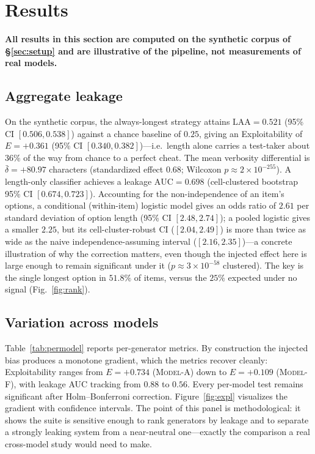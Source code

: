 \documentclass[10pt,twocolumn]{article}
\begin{document}
\section{Results}
\label{sec:results}

\noindent\textbf{All results in this section are computed on the synthetic
corpus of \S\ref{sec:setup} and are illustrative of the pipeline, not
measurements of real models.}

\subsection{Aggregate leakage}
On the synthetic corpus, the always-longest strategy attains
$\mathrm{LAA}=0.521$ (95\% CI $[0.506,0.538]$) against a chance baseline of
$0.25$, giving an Exploitability of $E={+}0.361$ (95\% CI
$[0.340,0.382]$)---i.e.\ length alone carries a test-taker about $36\%$ of the
way from chance to a perfect cheat. The mean verbosity differential is
$\bar\delta={+}80.97$ characters (standardized effect $0.68$; Wilcoxon
$p\approx2\times10^{-255}$). A length-only classifier achieves a leakage
$\mathrm{AUC}=0.698$ (cell-clustered bootstrap 95\% CI $[0.674,0.723]$).
Accounting for the non-independence of an item's options, a conditional
(within-item) logistic model gives an odds ratio of $2.61$ per standard deviation
of option length (95\% CI $[2.48,2.74]$); a pooled logistic gives a smaller
$2.25$, but its cell-cluster-robust CI ($[2.04,2.49]$) is more than twice as wide
as the naive independence-assuming interval ($[2.16,2.35]$)---a concrete
illustration of why the correction matters, even though the injected effect here
is large enough to remain significant under it ($p\!\approx\!3\times10^{-58}$
clustered). The key is the single longest option in $51.8\%$ of items, versus the
$25\%$ expected under no signal (Fig.~\ref{fig:rank}).

\subsection{Variation across models}
Table~\ref{tab:permodel} reports per-generator metrics. By construction the
injected bias produces a monotone gradient, which the metrics recover cleanly:
Exploitability ranges from $E={+}0.734$ (\textsc{Model-A}) down to
$E={+}0.109$ (\textsc{Model-F}), with leakage AUC tracking from $0.88$ to
$0.56$. Every per-model test remains significant after Holm--Bonferroni
correction. Figure~\ref{fig:expl} visualizes the gradient with confidence
intervals. The point of this panel is methodological: it shows the suite is
sensitive enough to rank generators by leakage and to separate a strongly
leaking system from a near-neutral one---exactly the comparison a real
cross-model study would need to make.
\end{document}
